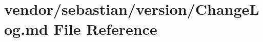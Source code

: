 \section{vendor/sebastian/version/\+Change\+Log.md File Reference}
\label{sebastian_2version_2_c_h_a_n_g_e_l_o_g_8md}
